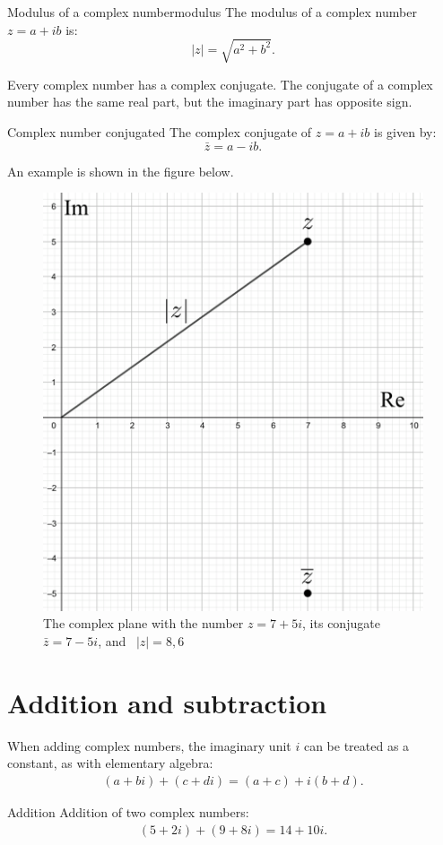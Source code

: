 \begin{definition}{Modulus of a complex number}{modulus}
The modulus of a complex number $z=a+ib$ is:
$$\mid z\mid=\sqrt{a^2+b^2}.$$
\end{definition}
\noindent
Every complex number has a complex conjugate. The conjugate of a complex number has the same real part, but the imaginary part has opposite sign.

\begin{definition}{Complex number conjugated}{}
The complex conjugate of $z=a+ib$ is given by:
$$\bar{z}=a-ib.$$
\end{definition}

\noindent An example is shown in the figure below.  

\begin{figure}[H]
\centering
\includegraphics[scale=0.2]{fig/img/complex_plan}
\caption{The complex plane with the number $z=7+5i$, its conjugate $\bar{z}=7-5i$, and \  $|z|=8,6$}
\end{figure}


\section{Addition and subtraction}
When adding complex numbers, the imaginary unit $i$ can be treated as a constant, as with elementary algebra:
\begin{align*}
(a + bi) + (c + di) = (a + c) + i(b + d).
\end{align*} 
\begin{example}{Addition}{}
Addition of two complex numbers:
\begin{align*}
(5+2i)+(9+8i)=14+10i.
\end{align*}
\end{example}


